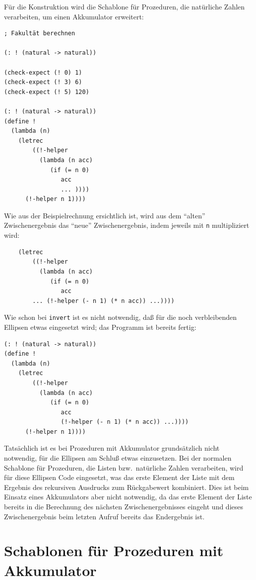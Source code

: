Für die Konstruktion wird die Schablone für Prozeduren, die natürliche
Zahlen verarbeiten, um einen Akkumulator erweitert:
\label{page:factorial-tail}
%
\begin{verbatim}
; Fakultät berechnen

(: ! (natural -> natural))

(check-expect (! 0) 1)
(check-expect (! 3) 6)
(check-expect (! 5) 120)

(: ! (natural -> natural))
(define !
  (lambda (n)
    (letrec
        ((!-helper
          (lambda (n acc)
             (if (= n 0)
                acc
                ... ))))
      (!-helper n 1))))
\end{verbatim}
%
Wie aus der Beispielrechnung ersichtlich ist, wird aus dem "`alten"'
Zwischenergebnis das "`neue"' Zwischenergebnis, indem jeweils
mit \texttt{n} multipliziert wird:
%
\begin{verbatim}
    (letrec
        ((!-helper
          (lambda (n acc)
             (if (= n 0)
                acc
        ... (!-helper (- n 1) (* n acc)) ...))))
\end{verbatim}
%
Wie schon bei \texttt{invert} ist es nicht notwendig, daß für die
noch verbleibenden Ellipsen etwas eingesetzt wird; das Programm ist
bereits fertig:
%
\begin{verbatim}
(: ! (natural -> natural))
(define !
  (lambda (n)
    (letrec
        ((!-helper
          (lambda (n acc)
             (if (= n 0)
                acc
                (!-helper (- n 1) (* n acc)) ...))))
      (!-helper n 1))))
\end{verbatim}
%
Tatsächlich ist es bei Prozeduren mit Akkumulator grundsätzlich nicht
notwendig, für die Ellipsen am Schluß etwas einzusetzen. Bei der
normalen Schablone für Prozeduren, die Listen bzw.\ natürliche Zahlen
verarbeiten, wird für diese Ellipsen Code eingesetzt, was das erste
Element der Liste mit dem Ergebnis des rekursiven Ausdrucks 
zum Rückgabewert kombiniert.  Dies ist beim Einsatz eines Akkumulators
aber nicht notwendig, da das erste Element der Liste bereits in die
Berechnung des nächsten Zwischenergebnisses eingeht und dieses
Zwischenergebnis beim letzten Aufruf bereits das Endergebnis ist.

\section{Schablonen für Prozeduren mit Akkumulator}

